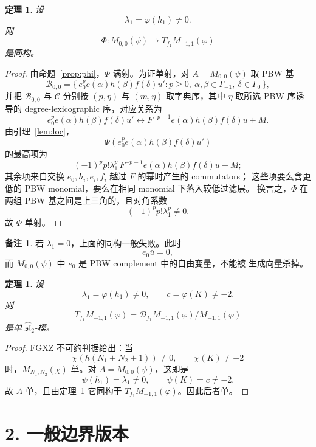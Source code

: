 \documentclass[UTF8,11pt]{ctexart}
\newcommand{\G}{\Gamma}
\newcommand{\slh}{\widehat{\mathfrak{sl}}_2}
\newcommand{\D}{\mathcal D}
\theoremstyle{plain}
\newtheorem{theorem}[proposition]{定理}
\theoremstyle{definition}
\newtheorem{remark}[proposition]{备注}
\begin{document}
\begin{theorem}\label{thm:iso}
设
\[
  \lambda_1=\varphi(h_1)\ne0.
\]
则
\[
  \Phi:M_{0,0}(\psi)\longrightarrow T_{f_1}M_{-1,1}(\varphi)
\]
是同构。
\end{theorem}

\begin{proof}
由命题~\ref{prop:phi}，\(\Phi\) 满射。为证单射，对 \(A=M_{0,0}(\psi)\)
取 PBW 基
\[
  \mathcal B_{0,0}
  =
  \{\,
    e_0^pe(\alpha)h(\beta)f(\delta)u':
    p\ge0,\ \alpha,\beta\in\G_{-1},\ \delta\in\G_0
  \,\},
\]
并把 \(\mathcal B_{0,0}\) 与 \(\mathcal C\) 分别按 \((p,\eta)\) 与
\((m,\eta)\) 取字典序，其中 \(\eta\) 取所选 PBW 序诱导的
degree-lexicographic 序，对应关系为
\[
  e_0^pe(\alpha)h(\beta)f(\delta)u'
  \longleftrightarrow
  F^{-p-1}e(\alpha)h(\beta)f(\delta)u+M.
\]
由引理~\ref{lem:loc}，
\[
  \Phi(e_0^pe(\alpha)h(\beta)f(\delta)u')
\]
的最高项为
\[
  (-1)^pp!\lambda_1^p\,F^{-p-1}e(\alpha)h(\beta)f(\delta)u+M;
\]
其余项来自交换 \(e_0,h_i,e_i,f_i\) 越过 \(F\) 的幂时产生的 commutators；
这些项要么含更低的 PBW monomial，要么在相同 monomial 下落入较低过滤层。
换言之，\(\Phi\) 在两组 PBW 基之间是上三角的，且对角系数
\[
  (-1)^pp!\lambda_1^p\ne0.
\]
故 \(\Phi\) 单射。
\end{proof}

\begin{remark}
若 \(\lambda_1=0\)，上面的同构一般失败。此时
\[
  e_0\bar u=0,
\]
而 \(M_{0,0}(\psi)\) 中 \(e_0\) 是 PBW complement 中的自由变量，不能被
生成向量杀掉。
\end{remark}

\begin{theorem}\label{thm:simple}
设
\[
  \lambda_1=\varphi(h_1)\ne0,\qquad c=\varphi(K)\ne-2.
\]
则
\[
  T_{f_1}M_{-1,1}(\varphi)=\D_{f_1}M_{-1,1}(\varphi)/M_{-1,1}(\varphi)
\]
是单 \(\slh\)-模。
\end{theorem}

\begin{proof}
FGXZ 不可约判据给出：当
\[
  \chi(h(N_1+N_2+1))\ne0,\qquad \chi(K)\ne-2
\]
时，\(M_{N_1,N_2}(\chi)\) 单。对 \(A=M_{0,0}(\psi)\)，这即是
\[
  \psi(h_1)=\lambda_1\ne0,\qquad \psi(K)=c\ne-2.
\]
故 \(A\) 单，且由定理~\ref{thm:iso} 它同构于
\(T_{f_1}M_{-1,1}(\varphi)\)。因此后者单。
\end{proof}

\section*{2. 一般边界版本}
\end{document}
